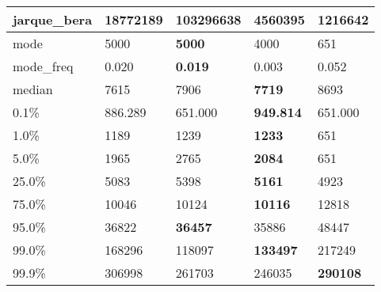 \begin{table}[H]
\begin{tabular}{|l|m{10em}|m{10em}|m{10em}|m{10em}|}
\hline jarque\_bera & 18772189 & \cellcolor[rgb]{0.9, 0.54, 0.52} 103296638 & \bfseries 4560395 & 1216642 \\
\hline mode & 5000 & \bfseries 5000 & 4000 & \cellcolor[rgb]{0.9, 0.54, 0.52} 651 \\
\hline mode\_freq & 0.020 & \bfseries 0.019 & 0.003 & \cellcolor[rgb]{0.9, 0.54, 0.52} 0.052 \\
\hline median & 7615 & 7906 & \bfseries 7719 & \cellcolor[rgb]{0.9, 0.54, 0.52} 8693 \\
\hline 0.1\% & 886.289 & \cellcolor[rgb]{0.9, 0.54, 0.52} 651.000 & \bfseries 949.814 & \cellcolor[rgb]{0.9, 0.54, 0.52} 651.000 \\
\hline 1.0\% & 1189 & 1239 & \bfseries 1233 & \cellcolor[rgb]{0.9, 0.54, 0.52} 651 \\
\hline 5.0\% & 1965 & 2765 & \bfseries 2084 & \cellcolor[rgb]{0.9, 0.54, 0.52} 651 \\
\hline 25.0\% & 5083 & \cellcolor[rgb]{0.9, 0.54, 0.52} 5398 & \bfseries 5161 & 4923 \\
\hline 75.0\% & 10046 & 10124 & \bfseries 10116 & \cellcolor[rgb]{0.9, 0.54, 0.52} 12818 \\
\hline 95.0\% & 36822 & \bfseries 36457 & 35886 & \cellcolor[rgb]{0.9, 0.54, 0.52} 48447 \\
\hline 99.0\% & 168296 & \cellcolor[rgb]{0.9, 0.54, 0.52} 118097 & \bfseries 133497 & 217249 \\
\hline 99.9\% & 306998 & 261703 & \cellcolor[rgb]{0.9, 0.54, 0.52} 246035 & \bfseries 290108 \\
\hline
\end{tabular}
\end{table}
